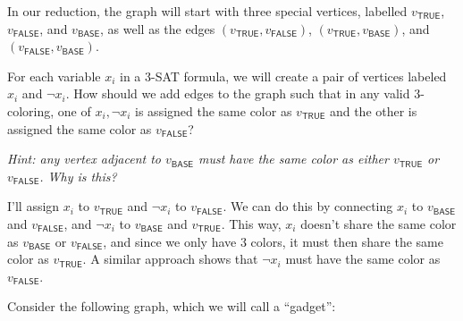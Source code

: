 \documentclass[11pt]{article}
\begin{document}
\noindent In our reduction, the graph will start with three special vertices, labelled $v_{\textsf{TRUE}}$, $v_{\textsf{FALSE}}$, and $v_{\textsf{BASE}}$, as well as the edges $(v_{\textsf{TRUE}}, v_{\textsf{FALSE}})$, $(v_{\textsf{TRUE}}, v_{\textsf{BASE}})$, and $(v_{\textsf{FALSE}}, v_{\textsf{BASE}})$. 
\begin{subparts}

\subpart For each variable $x_i$ in a 3-SAT formula, we will create a
pair of vertices labeled $x_i$ and $\lnot x_i$. How should we add
edges to the graph such that in any valid 3-coloring, one of
$x_i, \lnot x_i$ is assigned the same color as $v_{\textsf{TRUE}}$ and the other is assigned the same color as $v_{\textsf{FALSE}}$? 

\textit{Hint: any vertex adjacent to $v_{\textsf{BASE}}$ must have the same color as either $v_{\textsf{TRUE}}$ or $v_{\textsf{FALSE}}$. Why is this?}

\begin{solution}
	I'll assign \( x_i \) to \( v_\textsf{TRUE} \) and \( \neg x_i \) to \( v_{\textsf{FALSE}} \). We can do 
	this by connecting \( x_i \) to \( v_{\textsf{BASE}} \) and \( v_{\textsf{FALSE}} \), and 
	\( \neg x_i  \) to \( v_{\textsf{BASE}} \) and \( v_{\textsf{TRUE}} \). This way, \( x_i \) doesn't share 
	the same color as \( v_{\textsf{BASE}} \) or \( v_{\textsf{FALSE}} \), and since we only have 3 colors, 
	it must then share the same color as \( v_{\textsf{TRUE}} \). A similar approach shows that \( \neg x_i \) 
	must have the same color as \( v_{\textsf{FALSE}} \). 
\end{solution}

\subpart Consider the following graph, which we will call a ``gadget'':

\begin{center}
    \end{center}


\end{subparts}
\end{document}

